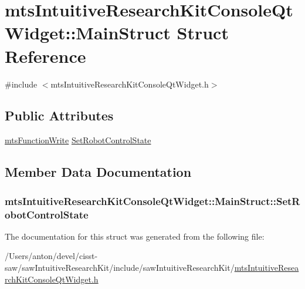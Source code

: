 \hypertarget{structmts_intuitive_research_kit_console_qt_widget_1_1_main_struct}{}\section{mts\+Intuitive\+Research\+Kit\+Console\+Qt\+Widget\+:\+:Main\+Struct Struct Reference}
\label{structmts_intuitive_research_kit_console_qt_widget_1_1_main_struct}


{\ttfamily \#include $<$mts\+Intuitive\+Research\+Kit\+Console\+Qt\+Widget.\+h$>$}

\subsection*{Public Attributes}
\begin{DoxyCompactItemize}
\item 
\hyperlink{classmts_function_write}{mts\+Function\+Write} \hyperlink{structmts_intuitive_research_kit_console_qt_widget_1_1_main_struct_ad0e29943f45f54098450f21f19ca207d}{Set\+Robot\+Control\+State}
\end{DoxyCompactItemize}


\subsection{Member Data Documentation}
\hypertarget{structmts_intuitive_research_kit_console_qt_widget_1_1_main_struct_ad0e29943f45f54098450f21f19ca207d}{}
\subsubsection[{Set\+Robot\+Control\+State}]{ mts\+Intuitive\+Research\+Kit\+Console\+Qt\+Widget\+::\+Main\+Struct\+::\+Set\+Robot\+Control\+State}\label{structmts_intuitive_research_kit_console_qt_widget_1_1_main_struct_ad0e29943f45f54098450f21f19ca207d}


The documentation for this struct was generated from the following file\+:\begin{DoxyCompactItemize}
\item 
/\+Users/anton/devel/cisst-\/saw/saw\+Intuitive\+Research\+Kit/include/saw\+Intuitive\+Research\+Kit/\hyperlink{mts_intuitive_research_kit_console_qt_widget_8h}{mts\+Intuitive\+Research\+Kit\+Console\+Qt\+Widget.\+h}\end{DoxyCompactItemize}
